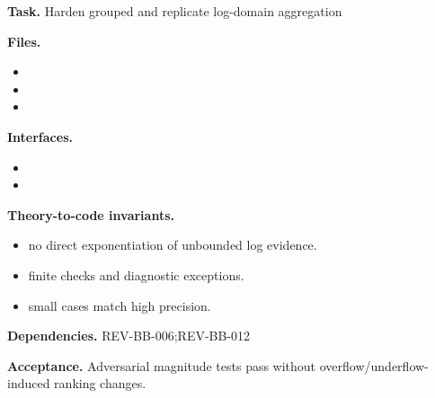 \begin{statusbox}[CODE-BB-004]
\textbf{Task.} Harden grouped and replicate log-domain aggregation\par
\textbf{Files.}
\begin{itemize}[leftmargin=1.7em,itemsep=1.5pt,topsep=2pt]
\item {}
\item {}
\item {}
\end{itemize}
\textbf{Interfaces.}
\begin{itemize}[leftmargin=1.7em,itemsep=1.5pt,topsep=2pt]
\item {}
\item {}
\end{itemize}
\textbf{Theory-to-code invariants.}
\begin{itemize}[leftmargin=1.7em,itemsep=1.5pt,topsep=2pt]
\item no direct exponentiation of unbounded log evidence.
\item finite checks and diagnostic exceptions.
\item small cases match high precision.
\end{itemize}
\textbf{Dependencies.} REV-BB-006;REV-BB-012\par
\textbf{Acceptance.} Adversarial magnitude tests pass without overflow/underflow-induced ranking changes.
\end{statusbox}

